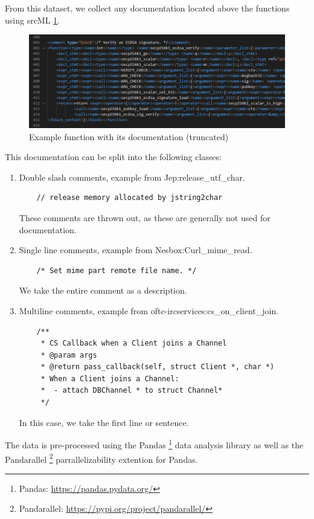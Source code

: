 From this dataset, we collect any documentation located above the functions using srcML \ref{fig:srcML}. 

\begin{figure}[H]
  \centering
  \includegraphics[width=\linewidth]{img/srcML.png}
  \caption{Example function with its documentation (truncated)}
  \label{fig:srcML}
\end{figure}

This documentation can be split into the following classes: 
\begin{enumerate}
  \item Double slash comments, example from Jep:release\_utf\_char. 
\begin{verbatim}
    // release memory allocated by jstring2char
\end{verbatim}
    These comments are thrown out, as these are generally not used for documentation.
  \item Single line comments, example from Nesbox:Curl\_mime\_read.
\begin{verbatim}
    /* Set mime part remote file name. */
\end{verbatim}
   We take the entire comment as a description.
  \item Multiline comments, example from oftc-ircservices:cs\_on\_client\_join.
\begin{verbatim}
    /**
     * CS Callback when a Client joins a Channel
     * @param args 
     * @return pass_callback(self, struct Client *, char *)
     * When a Client joins a Channel:
     *  - attach DBChannel * to struct Channel*
     */
\end{verbatim}
    In this case, we take the first line or sentence.
\end{enumerate}



The data is pre-processed using the Pandas \footnote{Pandas: \url{https://pandas.pydata.org/}} data analysis library as well as the Pandarallel \footnote{Pandarallel: \url{https://pypi.org/project/pandarallel/}} parrallelizability extention for Pandas.

